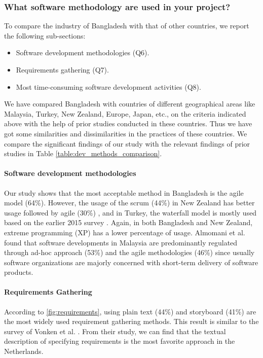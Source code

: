 \subsubsection{What software methodology are used in your project?}

To compare the industry of Bangladesh with that of other countries, we report the following sub-sections:

\begin{itemize}
\item Software development methodologies (Q6).
\item Requirements gathering (Q7).
\item Most time-consuming software development activities (Q8).
\end{itemize}



We have compared Bangladesh with countries of different geographical areas like Malaysia, Turkey, New Zealand, Europe, Japan, etc., on the criteria indicated above with the help of prior studies conducted in these countries. Thus we have got some similarities and dissimilarities in the practices of these countries. We compare the significant findings of our study with the relevant findings of prior studies in Table \ref{table:dev_methods_comparison}.


\paragraph{Software development methodologies}
Our study shows that the most acceptable method in Bangladesh is the agile model (64\%). However, the usage of the scrum (44\%) in New Zealand has better usage followed by agile (30\%) \citep{Wang2018}, and in Turkey, the waterfall model is mostly used based on the earlier 2015 survey \citep{Garousi2015}.  Again, in both Bangladesh and New Zealand, extreme programming (XP) has a lower percentage of usage. Almomani et al. \citep{Almomani2015} found that software developments in Malaysia are predominantly regulated through ad-hoc approach (53\%) and the agile methodologies (46\%) since usually software organizations are majorly concerned with short-term delivery of software products.


\paragraph{Requirements Gathering}
According to \ref{fig:requirements}, using plain text (44\%) and storyboard (41\%) are the most widely used requirement gathering methods. This result is similar to the survey of Vonken et al. \citep{Vonken2012}. From their study, we can find that the textual description of specifying requirements is the most favorite approach in the Netherlands.


